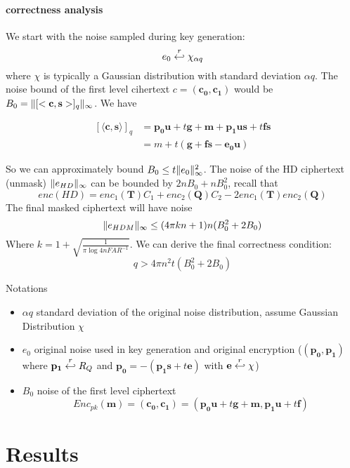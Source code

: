 \paragraph{correctness analysis}
We start with the noise sampled during key generation:
\[e_{0} \stackrel{r}{\hookleftarrow} \chi_{\alpha q}\]
where \(\chi\) is typically a Gaussian distribution with standard deviation \(\alpha q\). The noise bound of the first level cihertext \(c = (\mathbf{c_{0}, c_{1}})\) would be \(B_{0} = \Vert [<\mathbf{c,s}>]_{q} \Vert_{\infty}\). We have

\begin{align*}
  \left[ \langle \mathbf{c, s} \rangle \right]_{q} &= \mathbf{p_{0}u} + t \mathbf{g} + \mathbf{m} + \mathbf{p_{1}us} + t \mathbf{fs}\\
  &= m + t(\mathbf{g + fs -e_{0}u})
\end{align*}

So we can approximately bound \(B_{0} \leq t \Vert e_{0} \Vert_{\infty}^{2}\). The noise of the HD ciphertext (unmask) \(\Vert e_{HD} \Vert_{\infty}\) can be bounded by \(2nB_{0} + n B_{0}^{2}\), recall that
\[
  enc(HD) = enc_{1}(\mathbf{T})C_{1} + enc_{2}(\mathbf{Q})C_{2} - 2 enc_{1}(\mathbf{T})enc_{2}(\mathbf{Q})
\]
The final masked ciphertext will have noise
\[
\Vert e_{HDM} \Vert_{\infty} \leq (4\pi kn + 1)n(B_{0}^{2} + 2B_{0})
\]
Where \(k = 1 + \sqrt{\frac{1}{\pi \log{4n FAR^{-1}}}}\). We can derive the final correctness condition:
\[
q > 4 \pi n^{2} t (B_{0}^{2} + 2B_{0})
\]

Notations
\begin{itemize}
\item \(\alpha q\) standard deviation of the original noise distribution, assume Gaussian Distribution \(\chi\)
\item \(e_{0}\) original noise used in key generation and original encryption ($(\mathbf{p_0},\mathbf{p_1})$ where
  $\mathbf{p_1} \stackrel{r}{\hookleftarrow} R_Q$ and $\mathbf{p_0} = -(\mathbf{p_1}\mathbf{s} + t\mathbf{e})$ with
  $\mathbf{e} \stackrel{r}{\hookleftarrow} \chi$)
\item \(B_{0}\) noise of the first level ciphertext
  \[
    Enc_{pk}(\mathbf{m}) = (\mathbf{c_0},\mathbf{c_1}) = (\mathbf{p_0}\mathbf{u} + t\mathbf{g} + \mathbf{m},
    \mathbf{p_1}\mathbf{u} + t\mathbf{f})
  \]
\end{itemize}
  
 


\section{Results}
\label{sec:secProcResult}


    
